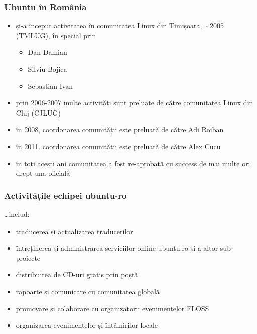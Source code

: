 \documentclass[compress]{beamer}
\begin{document}
\begin{frame}
\frametitle{Ubuntu în România}

\begin{itemize}[<+->]
  \item și-a început activitatea în comunitatea Linux din Timișoara, $\sim$2005 (TMLUG), în special prin
    \begin{itemize}[<+->]
      \item Dan Damian
      \item Silviu Bojica
      \item Sebastian Ivan
    \end{itemize}
  \item prin 2006-2007 multe activități sunt preluate de către comunitatea Linux din Cluj (CJLUG)
  \item în 2008, coordonarea comunității este preluată de către Adi Roiban
  \item în 2011. coordonarea comunității este preluată de către Alex Cucu
  \item în toți acești ani comunitatea a fost re-aprobată cu success de mai multe ori drept una oficială
\end{itemize}

\end{frame}

\begin{frame}
\frametitle{Activitățile echipei ubuntu-ro}

\ldots includ:

\begin{itemize}[<+->]
  \item traducerea și actualizarea traducerilor
  \item întreținerea și administrarea serviciilor online ubuntu.ro și a altor sub-proiecte
  \item distribuirea de CD-uri gratis prin poștă
  \item rapoarte și comunicare cu comunitatea globală
  \item promovare si colaborare cu organizatorii evenimentelor FLOSS
  \item organizarea evenimentelor și întâlnirilor locale
\end{itemize}
\end{frame}
\end{document}
